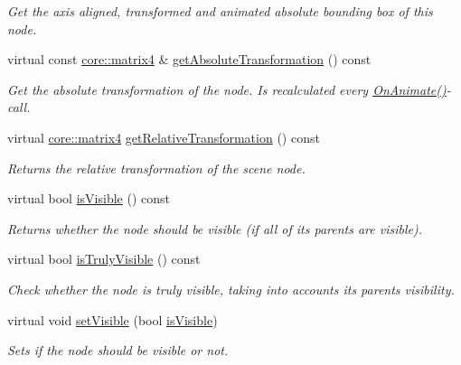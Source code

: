 \begin{DoxyCompactItemize}
\begin{DoxyCompactList}\small\item\em Get the axis aligned, transformed and animated absolute bounding box of this node. \end{DoxyCompactList}\item 
virtual const \hyperlink{namespaceirr_1_1core_a4c9d4e29899535971052810954a14431}{core\+::matrix4} \& \hyperlink{classirr_1_1scene_1_1ISceneNode_af13dc546a7be796cc0868a2eec51e508}{get\+Absolute\+Transformation} () const
\begin{DoxyCompactList}\small\item\em Get the absolute transformation of the node. Is recalculated every \hyperlink{classirr_1_1scene_1_1ISceneNode_afc1dcb5cb19116d0c7aa3d4ebdf04cc5}{On\+Animate()}-\/call. \end{DoxyCompactList}\item 
virtual \hyperlink{namespaceirr_1_1core_a4c9d4e29899535971052810954a14431}{core\+::matrix4} \hyperlink{classirr_1_1scene_1_1ISceneNode_ac7c47ec49174315af83cf5f5d24edb24}{get\+Relative\+Transformation} () const
\begin{DoxyCompactList}\small\item\em Returns the relative transformation of the scene node. \end{DoxyCompactList}\item 
virtual bool \hyperlink{classirr_1_1scene_1_1ISceneNode_a9e8e4e8be0055e8182eb26b055abf339}{is\+Visible} () const
\begin{DoxyCompactList}\small\item\em Returns whether the node should be visible (if all of its parents are visible). \end{DoxyCompactList}\item 
virtual bool \hyperlink{classirr_1_1scene_1_1ISceneNode_a457fda8e5bca28a1c7af1691fefd4f75}{is\+Truly\+Visible} () const
\begin{DoxyCompactList}\small\item\em Check whether the node is truly visible, taking into accounts its parents\textquotesingle{} visibility. \end{DoxyCompactList}\item 
virtual void \hyperlink{classirr_1_1scene_1_1ISceneNode_a2e3a88fe87d11caa7986a203afe6838c}{set\+Visible} (bool \hyperlink{classirr_1_1scene_1_1ISceneNode_a9e8e4e8be0055e8182eb26b055abf339}{is\+Visible})
\begin{DoxyCompactList}\small\item\em Sets if the node should be visible or not. \end{DoxyCompactList}\item 

\end{DoxyCompactItemize}
